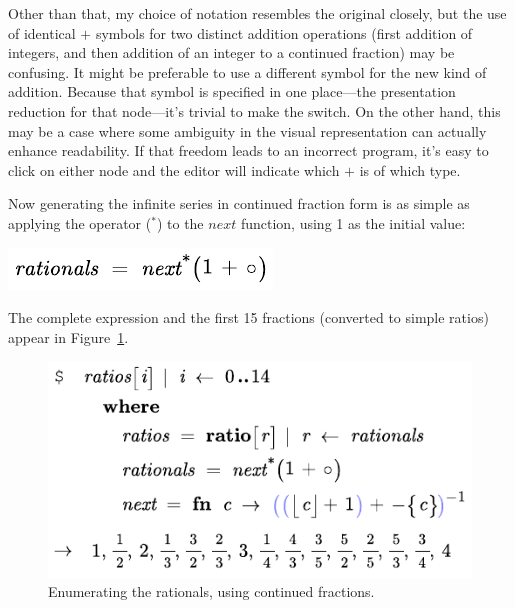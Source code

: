 Other than that, my choice of notation resembles the original closely, but the use of identical $+$ symbols for two distinct addition operations (first addition of integers, and then addition of an integer to a continued fraction) may be confusing. It might be preferable to use a different symbol for the new kind of addition. Because that symbol is specified in one place---the presentation reduction for that node---it's trivial to make the switch. On the other hand, this may be a case where some ambiguity in the visual representation can actually enhance readability. If that freedom leads to an incorrect program, it's easy to click on either node and the editor will indicate which $+$ is of which type.

Now generating the infinite series in continued fraction form is as simple as applying the  operator (${}^*$) to the $\mathit{next}$ function, using 1 as the initial value:
\begin{center}
\includegraphics[scale=1]{src/image/rationals-iter.pdf}
\end{center}
The complete expression and the first 15 fractions (converted to simple ratios) appear in Figure~\ref{fig-rationals}. 


\begin{figure}[t]
  \centering
    
  \includegraphics[scale=0.8]{src/image/rationals.pdf}
  
  \caption{Enumerating the rationals, using continued fractions.}
  \label{fig-rationals}
\end{figure}

